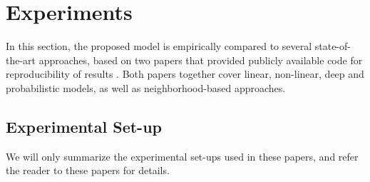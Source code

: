 \documentclass[sigconf]{acmart}
\newcommand{\sae}{}
\begin{document}
\section{Experiments}
\label{sec_exp}
In this section, the proposed \sae{}  model is empirically compared to several state-of-the-art approaches, based on two papers that provided publicly available code for reproducibility of results \cite{liang18,volkovs15}. Both papers together cover linear, non-linear, deep and probabilistic models, as well as neighborhood-based approaches.
\subsection{Experimental Set-up}
We will only summarize the experimental set-ups used in these papers, and refer the reader to these papers for  details.
\end{document}
